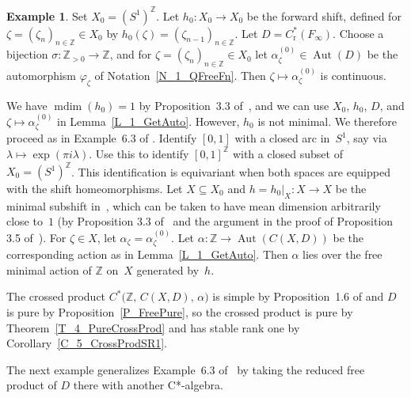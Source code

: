 \documentclass[10pt]{amsart}
\numberwithin{equation}{section}
\theoremstyle{definition}
\newtheorem{exa}[thm]{Example}
\newcommand{\af}{\alpha}
\newcommand{\zt}{\zeta}
\newcommand{\ld}{\lambda}
\newcommand{\sm}{\sigma}
\newcommand{\ph}{\varphi}
\newcommand{\Z}{{\mathbb{Z}}}
\newcommand{\N}{{\mathbb{Z}}_{> 0}}
\newcommand{\Aut}{{\operatorname{Aut}}}
\newcommand{\mdim}{{\operatorname{mdim}}}
\newcommand{\ct}{continuous}
\newcommand{\hme}{homeomorphism}
\renewcommand{\S}{\subseteq}
\begin{document}
\begin{exa}\label{E_1_ShiftAndFInf}
Set $X_0 = (S^1)^{\Z}$.
Let $h_0 \colon X_0 \to X_0$ be the
forward shift, defined for $\zt = (\zt_n)_{n \in \Z} \in X_0$
by $h_0 (\zt) = (\zt_{n - 1})_{n \in \Z}$.
Let $D = C^*_{\mathrm{r}} (F_{\infty})$.
Choose a bijection $\sm \colon \N \to \Z$, and for
$\zt = (\zt_n)_{n \in \Z} \in X_0$ let
$\af_{\zt}^{(0)} \in \Aut (D)$ be the automorphism $\ph_{\zt}$ of
Notation~\ref{N_1_QFreeFn}.
Then $\zt \mapsto \af_{\zt}^{(0)}$ is \ct.

We have $\mdim (h_0) = 1$ by Proposition~3.3 of~\cite{LndWs},
and we can use $X_0$, $h_0$, $D$, and
$\zt \mapsto \af^{(0)}_{\zt}$ in Lemma~\ref{L_1_GetAuto}.
However, $h_0$ is not minimal.
We therefore proceed as in Example~6.3 of \cite{ArBcPh2}.
Identify $[0, 1]$ with a closed arc in~$S^1$,
say via $\ld \mapsto \exp (\pi i \ld)$.
Use this to identify
$[0, 1]^{\Z}$ with a closed subset of $X_0 = (S^1)^{\Z}$.
This identification is equivariant when both spaces are
equipped with the shift \hme{s}.
Let $X \S X_0$ and
$h = h_0 |_{X} \colon X \to X$ be the minimal subshift
in~\cite{GlKr}, which can be taken to have mean dimension
arbitrarily close to~$1$ (by Proposition 3.3
of~\cite{LndWs} and the argument in the proof
of Proposition 3.5 of~\cite{LndWs}).
For $\zt \in X$, let
$\af_{\zt} = \af_{\zt}^{(0)}$.
Let
$\af \colon \Z \to \Aut (C (X, D))$ be the corresponding
action as in Lemma~\ref{L_1_GetAuto}.
Then $\af$ lies
over the free minimal action of $\Z$ on~$X$ generated by~$h$.

The crossed product
$C^* \bigl( \Z, \, C (X, D), \, \af \bigr)$ is simple
by Proposition~1.6 of \cite{ArBcPh2} and $D$ is pure by
Proposition~\ref{P_FreePure},
so the crossed product is pure by Theorem~\ref{T_4_PureCrossProd}
and has stable rank one by
Corollary~\ref{C_5_CrossProdSR1}.
\end{exa}

The next example generalizes Example~6.3 of~\cite{ArBcPh2}
by taking the reduced free product of $D$ there with another
C*-algebra.
\end{document}
